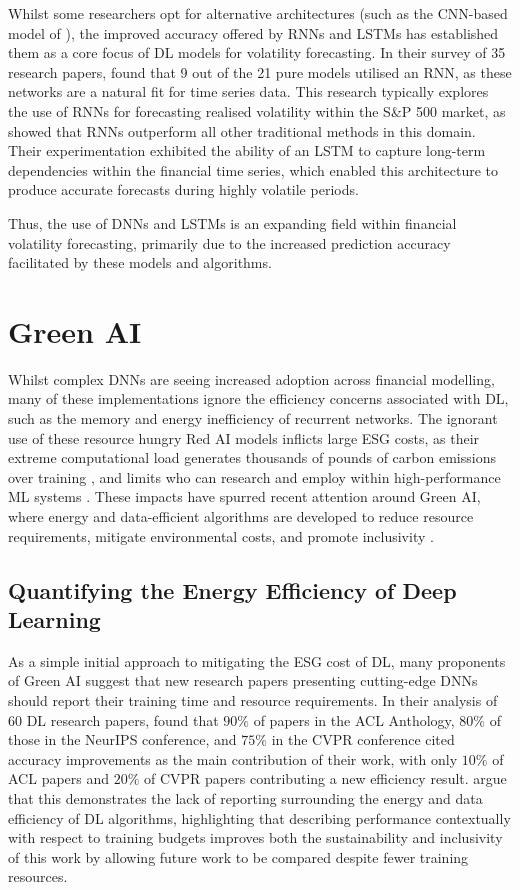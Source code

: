 \documentclass[a4paper, 11pt]{report}
\begin{document}
    Whilst some researchers opt for alternative architectures (such as the CNN-based model of \citet{chen-2018}), the improved accuracy offered by RNNs and LSTMs has established them as a core focus of DL models for volatility forecasting. In their survey of 35 research papers, \citet{ge-2022} found that 9 out of the 21 pure models utilised an RNN, as these networks are a natural fit for time series data. This research typically explores the use of RNNs for forecasting realised volatility within the S\&P 500 market, as \citet{bucci-2020} showed that RNNs outperform all other traditional methods in this domain. Their experimentation exhibited the ability of an LSTM to capture long-term dependencies within the financial time series, which enabled this architecture to produce accurate forecasts during highly volatile periods. 
    
    Thus, the use of DNNs and LSTMs is an expanding field within financial volatility forecasting, primarily due to the increased prediction accuracy facilitated by these models and algorithms.


    \section{Green AI}

    Whilst complex DNNs are seeing increased adoption across financial modelling, many of these implementations ignore the efficiency concerns associated with DL, such as the memory and energy inefficiency of recurrent networks. The ignorant use of these resource hungry Red AI models inflicts large ESG costs, as their extreme computational load generates thousands of pounds of carbon emissions over training \citep{strubell-2019}, and limits who can research and employ within high-performance ML systems \citep{bender-2021}. These impacts have spurred recent attention around Green AI, where energy and data-efficient algorithms are developed to reduce resource requirements, mitigate environmental costs, and promote inclusivity \citep{schwartz-2019}.


    \subsection{Quantifying the Energy Efficiency of Deep Learning}

    As a simple initial approach to mitigating the ESG cost of DL, many proponents of Green AI suggest that new research papers presenting cutting-edge DNNs should report their training time and resource requirements. In their analysis of 60 DL research papers, \citet{schwartz-2019} found that $90\%$ of papers in the ACL Anthology, $80\%$ of those in the NeurIPS conference, and $75\%$ in the CVPR conference cited accuracy improvements as the main contribution of their work, with only $10\%$ of ACL papers and $20\%$ of CVPR papers contributing a new efficiency result. \citet{schwartz-2019} argue that this demonstrates the lack of reporting surrounding the energy and data efficiency of DL algorithms, highlighting that describing performance contextually with respect to training budgets improves both the sustainability and inclusivity of this work by allowing future work to be compared despite fewer training resources.
\end{document}
